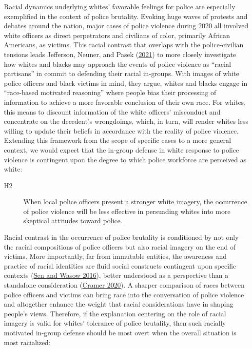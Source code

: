 \documentclass[
  12pt,
]{article}
\begin{document}
Racial dynamics underlying whites' favorable feelings for police are
especially exemplified in the context of police brutality. Evoking huge
waves of protests and debates around the nation, major cases of police
violence during 2020 all involved white officers as direct perpetrators
and civilians of color, primarily African Americans, as victims. This
racial contrast that overlaps with the police-civilian tensions leads
Jefferson, Neuner, and Pasek
(\protect\hyperlink{ref-jefferson2021}{2021}) to more closely
investigate how whites and blacks may approach the events of police
violence as ``racial partisans'' in commit to defending their racial
in-groups. With images of white police officers and black victims in
mind, they argue, whites and blacks engage in ``race-based motivated
reasoning'' where people bias their processing of information to achieve
a more favorable conclusion of their own race. For whites, this means to
discount information of the white officers' misconduct and concentrate
on the decedent's wrongdoings, which, in turn, will render whites less
willing to update their beliefs in accordance with the reality of police
violence. Extending this framework from the scope of specific cases to a
more general context, we would expect that the in-group defense in white
response to police violence is contingent upon the degree to which
police workforce are perceived as white:

\begin{description}
\item[H2]
When local police officers present a stronger white imagery, the
occurrence of police violence will be less effective in persuading
whites into more skeptical attitudes toward police.
\end{description}

Racial contrast in the occurrence of police brutality is conditioned by
not only the racial compositions of police officers but also racial
imagery on the end of victims. More importantly, far from immutable
entities, the awareness and practice of racial identities are fluid
social constructs contingent upon specific contexts
(\protect\hyperlink{ref-sen2016}{Sen and Wasow 2016}), better understood
as a perspective than a standalone consideration
(\protect\hyperlink{ref-cramer2020}{Cramer 2020}). A sharper comparison
of races between police officers and victims can bring race into the
conversation of police violence and altogether enhance the weight that
racial considerations have in shaping people's views. Therefore, if the
explanation centering on the role of racial imagery is valid for whites'
tolerance of police brutality, then such racially motivated in-group
defense should be most overt when the overall situation is most
racialized:
\end{document}
